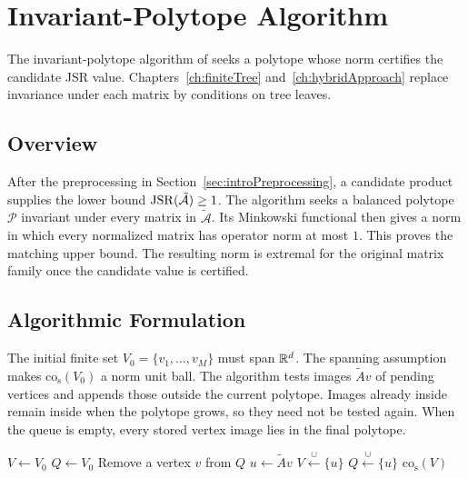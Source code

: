 \chapter{Invariant-Polytope Algorithm}
\label{ch:invariantPolytope}

The invariant-polytope algorithm of \citet{GuglielmiProtasov2013ExactComputationJSR} seeks a polytope whose norm certifies the candidate JSR value.
Chapters~\ref{ch:finiteTree} and~\ref{ch:hybridApproach} replace invariance under each matrix by conditions on tree leaves.

\section{Overview}

After the preprocessing in Section~\ref{sec:introPreprocessing}, a candidate product supplies the lower bound $\operatorname{JSR}(\tilde{\mathcal{A}})\geq1$.
The algorithm seeks a balanced polytope $\mathcal{P}$ invariant under every matrix in $\tilde{\mathcal{A}}$.
Its Minkowski functional then gives a norm in which every normalized matrix has operator norm at most $1$.
This proves the matching upper bound.
The resulting norm is extremal for the original matrix family once the candidate value is certified.

\section{Algorithmic Formulation}
\label{sec:invAlgorithmStructure}

The initial finite set $V_0=\{v_1,\dots,v_M\}$ must span $\mathbb{R}^d$.
The spanning assumption makes $\mathrm{co}_{\mathrm{s}}(V_0)$ a norm unit ball.
The algorithm tests images $\tilde{A}v$ of pending vertices and appends those outside the current polytope.
Images already inside remain inside when the polytope grows, so they need not be tested again.
When the queue is empty, every stored vertex image lies in the final polytope.

\begin{algorithm}[ht]
    \caption{Invariant-polytope algorithm}
    \label{alg:invariantPolytope}
    \begin{algorithmic}
        \State {}
        \State $V\gets V_0$
        \State $Q\gets V_0$
            \State Remove a vertex $v$ from $Q$
                    \State $u\gets\tilde{A}v$
                    \State $V\xleftarrow{\cup}\{u\}$
                    \State $Q\xleftarrow{\cup}\{u\}$
                \EndIf
            \EndFor
        \EndWhile
        \State \Return $\mathrm{co}_{\mathrm{s}}(V)$
    \end{algorithmic}
\end{algorithm}

